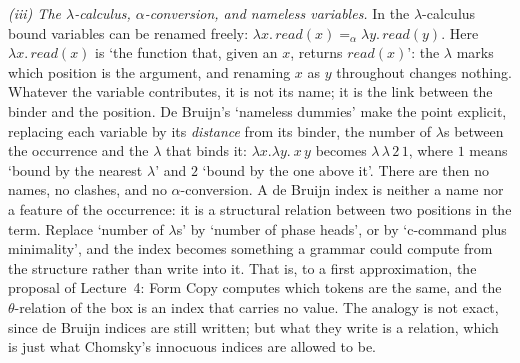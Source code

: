 \documentclass[
  layout=tufte,           %
  twoside=false, open=any,
  font=pagella,
  chapterprefix=false,
  numbers=noendperiod,    %
  headings=optiontohead,  %
  parskip=half-,          %
  colorlinks=true,
  examples=gb4e,
  minsyn=true,            %
  bib=natbib, bibstyle=glossa, bibfile=keio,
  greek=false,
]{gtbook}
\begin{document}
\begin{excursus*}
\textit{(iii) The $\lambda$-calculus, $\alpha$-conversion, and nameless
  variables.} In the $\lambda$-calculus \citep{Church1941} bound variables can
be renamed freely:
$\lambda x.\,\mathit{read}(x) =_\alpha \lambda y.\,\mathit{read}(y)$. Here $\lambda x.\,\mathit{read}(x)$ is `the function that, given an $x$, returns $\mathit{read}(x)$': the $\lambda$ marks which position is the argument, and renaming $x$ as $y$ throughout changes nothing. Whatever the variable contributes, it is not its name; it is the link between the binder
and the position. De Bruijn's `nameless dummies' \citep{deBruijn1972} make the
point explicit, replacing each variable by its \emph{distance} from its binder,
the number of $\lambda$s between the occurrence and the $\lambda$ that binds it:
$\lambda x.\lambda y.\ x\,y$ becomes $\lambda\,\lambda\,2\,1$, where $1$ means `bound by the nearest $\lambda$' and $2$ `bound by the one above it'. There are then no names, no clashes, and no $\alpha$-conversion. A de Bruijn index is neither a
name nor a feature of the occurrence: it is a structural relation between two
positions in the term. Replace `number of $\lambda$s' by `number of phase
heads', or by `c-command plus minimality', and the index becomes something a
grammar could compute from the structure rather than write into it. That is, to
a first approximation, the proposal of Lecture~4: Form Copy computes which tokens
are the same, and the $\theta$-relation of the box is an index that carries no
value. The analogy is not exact, since de Bruijn indices are still written; but
what they write is a relation, which is just what Chomsky's innocuous indices
are allowed to be.


\end{excursus*}
\end{document}

